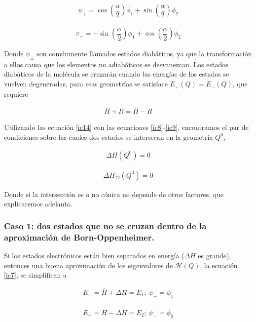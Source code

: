 \documentclass[12pt]{report}
\begin{document}
\begin{align}
\psi_+=\cos \left( \dfrac{\alpha}{2} \right) \phi_1 
+ \sin \left( \dfrac{\alpha}{2} \right) \phi_2
\end{align}

\begin{align}
\pi_-=-\sin \left( \dfrac{\alpha}{2} \right) \phi_1 
+ \cos \left( \dfrac{\alpha}{2} \right) \phi_2
\end{align}

Donde $\psi_\pm$ son comúnmente llamados estados diabáticos, ya que la transformación a ellos causa que los elementos no adiabáticos se desvanezcan. Los estados diabáticos de la molécula se cruzarán cuando las energías de los estados se vuelven degeneradas, para esas geometrías se satisface $E_+ (Q)=E_- (Q)$, que requiere

\begin{align}
\bar{H}+R=\bar{H}-R
\label{ic14}
\end{align}

Utilizando las ecuación \ref{ic14} con las ecuaciones \ref{ic8}-\ref{ic9}, encontramos el par de condiciones sobre las cuales dos estados se intersecan en la geometría $Q^0$,

\begin{align}
\Delta H (Q^0)=0
\label{ic15}
\end{align}

\begin{align}
\Delta H_{12}(Q^0)=0
\label{ic16}
\end{align}

Donde si la intersección es o no cónica no depende de otros factores, que explicaremos adelanto.

\newpage

\subsubsection{Caso 1: dos estados que no se cruzan dentro de la aproximación de Born-Oppenheimer.}

Si los estados electrónicos están bien separados en energía ($\Delta H$ es grande), entonces una buena aproximación de los eigenvalores de $\mathcal{H}(Q)$, la ecuación \ref{ic7}, se simplifican a 

\begin{align}
E_+=\bar{H}+\Delta H = E_1  ; \ \psi_+=\phi_1
\label{ic17}
\end{align}

\begin{align}
E_-=\bar{H}-\Delta H = E_2 ;\ \psi_-=\phi_2
\label{ic18}
\end{align}
\end{document}
